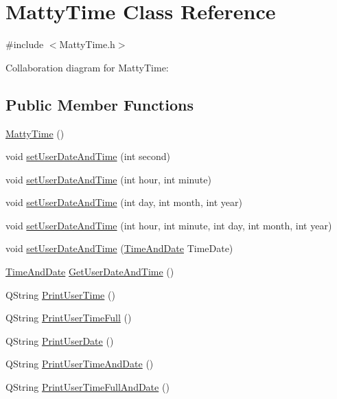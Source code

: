 \hypertarget{classMattyTime}{}\section{Matty\+Time Class Reference}
\label{classMattyTime}


{\ttfamily \#include $<$Matty\+Time.\+h$>$}



Collaboration diagram for Matty\+Time\+:
\subsection*{Public Member Functions}
\begin{DoxyCompactItemize}
\item 
\hyperlink{classMattyTime_aebf245aa0b578982cad3f679ea5348cd}{Matty\+Time} ()
\item 
void \hyperlink{classMattyTime_a858357a5febc483c27f9bbf96b83b175}{set\+User\+Date\+And\+Time} (int second)
\item 
void \hyperlink{classMattyTime_a60828ca950added6776f53ca3ea047fc}{set\+User\+Date\+And\+Time} (int hour, int minute)
\item 
void \hyperlink{classMattyTime_ac6d00b726df1a8c493452dfc52332f6f}{set\+User\+Date\+And\+Time} (int day, int month, int year)
\item 
void \hyperlink{classMattyTime_a34af1776506d7a99387db16982987e1c}{set\+User\+Date\+And\+Time} (int hour, int minute, int day, int month, int year)
\item 
void \hyperlink{classMattyTime_ae470fb0341c517348ec3ea7d606f67c5}{set\+User\+Date\+And\+Time} (\hyperlink{structTimeAndDate}{Time\+And\+Date} Time\+Date)
\item 
\hyperlink{structTimeAndDate}{Time\+And\+Date} \hyperlink{classMattyTime_ac2f2f818e4c476cc11f9c13e97cacfae}{Get\+User\+Date\+And\+Time} ()
\item 
Q\+String \hyperlink{classMattyTime_a9cbf666ccbe45a8ca45f9ffc42d5102c}{Print\+User\+Time} ()
\item 
Q\+String \hyperlink{classMattyTime_a3fda0198071ebc95afe2d4405dd9c55e}{Print\+User\+Time\+Full} ()
\item 
Q\+String \hyperlink{classMattyTime_a646278576993d7ed05af67aee6ac96cb}{Print\+User\+Date} ()
\item 
Q\+String \hyperlink{classMattyTime_afa30c1dd3bae1e8f50e816803f39d1c4}{Print\+User\+Time\+And\+Date} ()
\item 
Q\+String \hyperlink{classMattyTime_a6bcaa1f4975d99ab2f9025076de5ef99}{Print\+User\+Time\+Full\+And\+Date} ()

\end{DoxyCompactItemize}
